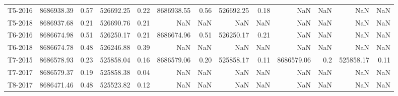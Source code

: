 \begin{tabular}{lrrrrrrrrrrrr}
     T5-2016 &                8686938.39 &                            0.57 &                526692.25 &                           0.22 &                8686938.55 &                            0.56 &                526692.25 &                           0.18 &                       NaN &                             NaN &                      NaN &                            NaN \\
     T5-2018 &                8686937.68 &                            0.21 &                526690.76 &                           0.21 &                       NaN &                             NaN &                      NaN &                            NaN &                       NaN &                             NaN &                      NaN &                            NaN \\
     T6-2016 &                8686674.98 &                            0.51 &                526250.17 &                           0.21 &                8686674.96 &                            0.51 &                526250.17 &                           0.21 &                       NaN &                             NaN &                      NaN &                            NaN \\
     T6-2018 &                8686674.78 &                            0.48 &                526246.88 &                           0.39 &                       NaN &                             NaN &                      NaN &                            NaN &                       NaN &                             NaN &                      NaN &                            NaN \\
     T7-2015 &                8686578.93 &                            0.23 &                525858.04 &                           0.16 &                8686579.06 &                            0.20 &                525858.17 &                           0.11 &                8686579.06 &                             0.2 &                525858.17 &                           0.11 \\
     T7-2017 &                8686579.37 &                            0.19 &                525858.38 &                           0.04 &                       NaN &                             NaN &                      NaN &                            NaN &                       NaN &                             NaN &                      NaN &                            NaN \\
     T8-2017 &                8686471.46 &                            0.48 &                525523.82 &                           0.12 &                       NaN &                             NaN &                      NaN &                            NaN &                       NaN &                             NaN &                      NaN &                            NaN \\
\bottomrule
\end{tabular}
